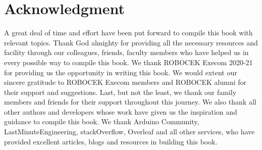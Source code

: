 \chapter*{Acknowledgment}
\begin{fullwidth}
	\begin{doublespace}
		\justify
		\par A great deal of time and effort have been put forward to compile this book with relevant topics. Thank God almighty for providing all the necessary resources and facility through our colleagues, friends, faculty members who have helped us in every possible way to compile this book. We thank ROBOCEK Execom 2020-21 for providing us the opportunity in writing this book. We would extent our sincere gratitude to ROBOCEK Execom members and ROBOCEK alumni for their support and suggestions. Last, but not the least, we thank our family members and friends for their support throughout this journey. We also thank all other authors and developers whose work have given us the inspiration and guidance to compile this book. We thank Arduino Community, LastMinuteEngineering, stackOverflow, Overleaf and all other services, who have provided excellent articles, blogs and resources in building this book.
	\end{doublespace}
\end{fullwidth}